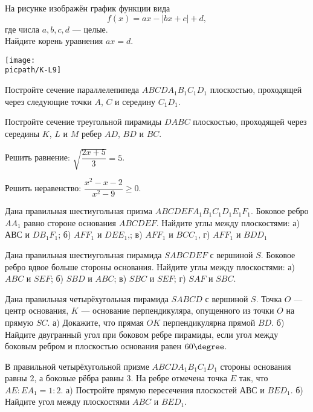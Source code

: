 \begin{homework}[number=1]
	\begin{listofex}
		\item
		\begin{minipage}[t]{\bodywidth}
			На рисунке изображён график функции вида \[ f(x)=ax-|bx+c|+d, \] где числа \(a, b, c, d\) --- целые.\\ Найдите корень уравнения \(ax=d\).
		\end{minipage}
		\hspace{0.02\linewidth}
		\begin{minipage}[t]{\picwidth}
			\texttt{[image: \\picpath/K-L9]}
		\end{minipage}
		\item Постройте сечение параллелепипеда \( ABCDA_1B_1C_1D_1 \)
		плоскостью, проходящей через следующие точки \( A \), \( C \) и середину \( C_1D_1 \).
		\item Постройте сечение треугольной пирамиды \( DABC \) плоскостью,
		проходящей через середины \( K \), \( L \) и \( M \) ребер \( AD \), \( BD \) и \( BC \).
		\item Решить равнение: \( \sqrt{\dfrac{2x+5}{3}}=5 \).
		\item Решить неравенство: \( \dfrac{x^2-x-2}{x^2-9}\ge0 \).
	\end{listofex}
\end{homework}

\begin{homework}[number=2]
	\begin{listofex}
		\item Дана правильная шестиугольная призма \(ABCDEFA_1B_1C_1D_1E_1F_1\). Боковое ребро \(AA_1\) равно стороне основания \(ABCDEF\). Найдите углы между плоскостями: а) \(АВС\) и \(DB_1F_1\); б) \(AFF_1\) и \(DEE_1\),; в) \(AFF_1\) и \(BCC_1\), г) \(AFF_1\) и \(BDD_1\)
		\item Дана правильная шестиугольная пирамида \(SABCDEF\) с вершиной \(S\). Боковое ребро вдвое больше стороны основания. Найдите углы между плоскостями: а) \(ABC\) и \(SEF\); б) \(SBD\) и \(ABC\); в) \(SBC\) и \(SEF\); г) \(SAF\) и \(SBC\).
		\item Дана правильная четырёхугольная пирамида \(SABCD\) с вершиной \(S\). Точка \(O\) --- центр основания, \(K\) --- основание перпендикуляра, опущенного из точки \(O\) на прямую \(SC\). а) Докажите, что прямая \(OK\) перпендикулярна прямой \(BD\). б) Найдите двугранный угол при боковом ребре пирамиды, если угол между боковым ребром и плоскостью основания равен \(60 \degree \).
		\item В правильной четырёхугольной призме \(ABCDA_1B_1C_1D_1\) стороны основания равны \(2\), а боковые рёбра равны \(3\). На ребре отмечена точка \(E\) так, что \(AE:EA_1 = 1:2\). а) Постройте прямую пересечения плоскостей \(АВС\) и \(BED_1\). б) Найдите угол между плоскостями \(ABC\) и \(BED_1\).
	\end{listofex}
\end{homework}

